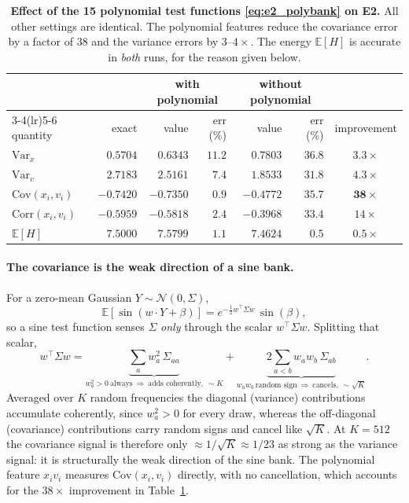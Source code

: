 \documentclass[11pt]{article}
\newcommand{\E}{\mathbb{E}}
\theoremstyle{plain}
\begin{document}
\begin{table}[H]
\centering
\begin{tabular}{@{}lrrrrrc@{}}
\toprule
& & \multicolumn{2}{c}{\textbf{with polynomial}} & \multicolumn{2}{c}{\textbf{without polynomial}} & \\
\cmidrule(lr){3-4}\cmidrule(lr){5-6}
quantity & exact & value & err (\%) & value & err (\%) & improvement\\
\midrule
$\mathrm{Var}_x$          & $0.5704$  & $0.6343$  & $11.2$ & $0.7803$  & $36.8$ & $3.3\times$\\
$\mathrm{Var}_v$          & $2.7183$  & $2.5161$  & $7.4$  & $1.8533$  & $31.8$ & $4.3\times$\\
$\mathrm{Cov}(x_i,v_i)$   & $-0.7420$ & $-0.7350$ & $\mathbf{0.9}$ & $-0.4772$ & $35.7$ & $\mathbf{38\times}$\\
$\mathrm{Corr}(x_i,v_i)$  & $-0.5959$ & $-0.5818$ & $2.4$  & $-0.3968$ & $33.4$ & $14\times$\\
$\E[H]$                   & $7.5000$  & $7.5799$  & $1.1$  & $7.4624$  & $0.5$  & $0.5\times$\\
\bottomrule
\end{tabular}
\caption{\textbf{Effect of the 15 polynomial test functions \eqref{eq:e2_polybank} on E2.} All other settings are identical. The polynomial features reduce the covariance error by a factor of $38$ and the variance errors by $3$--$4\times$. The energy $\E[H]$ is accurate in \emph{both} runs, for the reason given below.}
\label{tab:e2_poly}
\end{table}


\paragraph{The covariance is the weak direction of a sine bank.}
For a zero-mean Gaussian $Y\sim\mathcal N(0,\Sigma)$,
\begin{equation}
\E[\sin(w\cdot Y+\beta)]=e^{-\frac12 w^\top\Sigma w}\,\sin(\beta),
\label{eq:e2_sinexp}
\end{equation}
so a sine test function senses $\Sigma$ \emph{only} through the scalar $w^\top\Sigma w$. Splitting that scalar,
\begin{equation}
w^\top\Sigma w=\underbrace{\sum_a w_a^2\,\Sigma_{aa}}_{w_a^2>0\ \text{always}\ \Rightarrow\ \text{adds coherently},\ \sim K}
+\underbrace{2\!\!\sum_{a<b} w_aw_b\,\Sigma_{ab}}_{w_aw_b\ \text{random sign}\ \Rightarrow\ \text{cancels},\ \sim\sqrt K}.
\label{eq:e2_cancel}
\end{equation}
Averaged over $K$ random frequencies the diagonal (variance) contributions accumulate coherently, since $w_a^2>0$ for every draw, whereas the off-diagonal (covariance) contributions carry random signs and cancel like $\sqrt K$. At $K=512$ the covariance signal is therefore only $\approx1/\sqrt K\approx1/23$ as strong as the variance signal: it is structurally the weak direction of the sine bank. The polynomial feature $x_iv_i$ measures $\mathrm{Cov}(x_i,v_i)$ directly, with no cancellation, which accounts for the $38\times$ improvement in Table~\ref{tab:e2_poly}.
\end{document}
